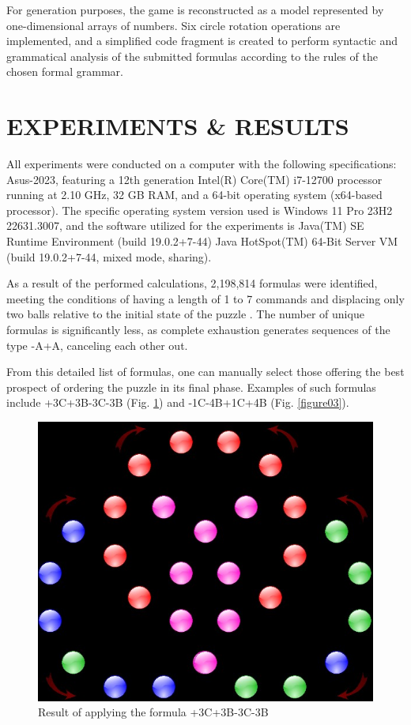\documentclass[a4paper,twocolumn,10pt]{article}
\begin{document}
For generation purposes, the game is reconstructed as a model \cite{YILMAZ2023100586} represented by one-dimensional arrays of numbers. Six circle rotation operations are implemented, and a simplified code fragment is created to perform syntactic and grammatical analysis of the submitted formulas according to the rules of the chosen formal grammar.

\section{EXPERIMENTS \& RESULTS}

All experiments were conducted on a computer with the following specifications: Asus-2023, featuring a 12th generation Intel(R) Core(TM) i7-12700 processor running at 2.10 GHz, 32 GB RAM, and a 64-bit operating system (x64-based processor). The specific operating system version used is Windows 11 Pro 23H2 22631.3007, and the software utilized for the experiments is Java(TM) SE Runtime Environment (build 19.0.2+7-44) Java HotSpot(TM) 64-Bit Server VM (build 19.0.2+7-44, mixed mode, sharing).

As a result of the performed calculations, 2,198,814 formulas were identified, meeting the conditions of having a length of 1 to 7 commands and displacing only two balls relative to the initial state of the puzzle \cite{Balabanov2024b}. The number of unique formulas is significantly less, as complete exhaustion generates sequences of the type -A+A, canceling each other out.

From this detailed list of formulas, one can manually select those offering the best prospect of ordering the puzzle in its final phase. Examples of such formulas include +3C+3B-3C-3B (Fig. \ref{figure02}) and -1C-4B+1C+4B (Fig. \ref{figure03}).

\begin{figure}
	\centering
	\includegraphics[width=1.0\linewidth]{figure02.png}
	\caption{Result of applying the formula +3C+3B-3C-3B}
	\label{figure02}
\end{figure}
\end{document}
